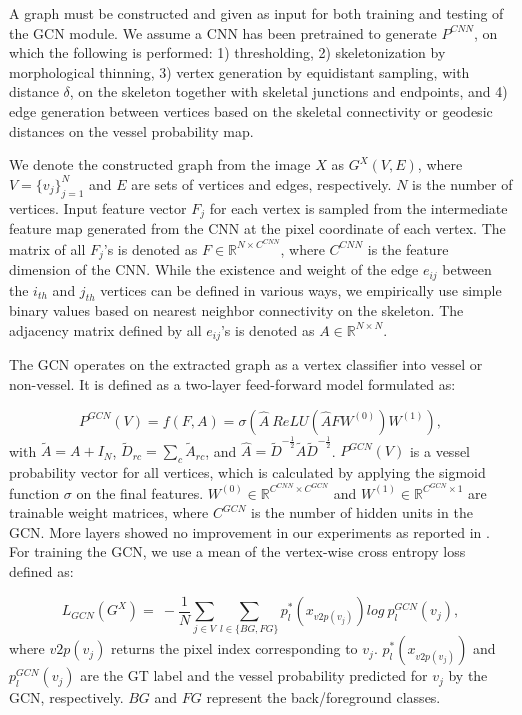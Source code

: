 \documentclass[runningheads,a4paper]{llncs}
\begin{document}
A graph must be constructed and given as input for both training and testing of the GCN module. We assume a CNN has been pretrained to generate $P^{CNN}$, on which the following is performed: 1) thresholding, 2) skeletonization by morphological thinning, 3) vertex generation by equidistant sampling, with distance $\delta$, on the skeleton together with skeletal junctions and endpoints, and 4) edge generation between vertices based on the skeletal connectivity or geodesic distances on the vessel probability map.



We denote the constructed graph from the image $X$ as $G^{X}(V,E)$, where $V=\{v_j\}_{j=1}^{N}$ and $E$ are sets of vertices and edges, respectively. $N$ is the number of vertices. Input feature vector $F_{j}$ for each vertex is sampled from the intermediate feature map generated from the CNN at the pixel coordinate of each vertex. The matrix of all $F_{j}$'s is denoted as $F\in\mathbb{R}^{N \times C^{CNN}}$, where $C^{CNN}$ is the feature dimension of the CNN. While the existence and weight of the edge $e_{ij}$ between the $i_{th}$ and $j_{th}$ vertices can be defined in various ways, we empirically use simple binary values based on nearest neighbor connectivity on the skeleton. The adjacency matrix defined by all $e_{ij}$'s is denoted as $A\in\mathbb{R}^{N \times N}$.

The GCN operates on the extracted graph as a vertex classifier into vessel or non-vessel. It is defined as a two-layer feed-forward model formulated as:

\begin{equation}
\label{eq:GCN_equation}
P^{GCN}(V)=f(F,A)=\sigma(\hat{A}\ ReLU(\hat{A}FW^{(0)})W^{(1)}),  
\end{equation}   
with $\widetilde{A}=A+I_N$, ${\widetilde{D}}_{rc}=\sum_{c}{\widetilde{A}}_{rc}$, and $\hat{A}={\widetilde{D}}^{-\frac{1}{2}}\widetilde{A}{\widetilde{D}}^{-\frac{1}{2}}$. $P^{GCN}(V)$ is a vessel probability vector for all vertices, which is calculated by applying the sigmoid function $\sigma$ on the final features. $W^{(0)}\in\mathbb{R}^{C^{CNN} \times C^{GCN}}$ and $W^{(1)}\in\mathbb{R}^{C^{GCN} \times 1}$ are trainable weight matrices, where $C^{GCN}$ is the number of hidden units in the GCN. More layers showed no improvement in our experiments as reported in \cite{kipf17}. For training the GCN, we use a mean of the vertex-wise cross entropy loss defined as:

\begin{equation}
\label{eq:GCN_loss}
L_{GCN}(G^{X}) = \ -\frac{1}{N}\sum_{j\in V}\sum_{l\in\{BG,FG\}}{p_l^*(x_{v2p(v_j)})log\ p_l^{GCN}(v_j)},
\end{equation}
where $v2p(v_j)$ returns the pixel index corresponding to $v_j$.  $p_l^*(x_{v2p(v_j)})$ and $p_l^{GCN}(v_j)$ are the GT label and the vessel probability predicted for $v_j$ by the GCN, respectively. $BG$ and $FG$ represent the back/foreground classes. 
\end{document}
